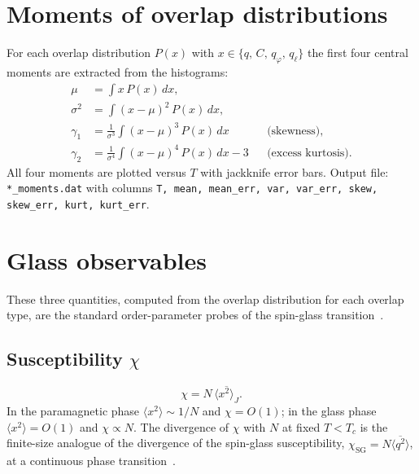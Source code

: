 \documentclass[11pt,a4paper]{article}
\newcommand{\avg}[1]{\langle #1 \rangle}
\newcommand{\avgJ}[1]{\overline{#1}}
\begin{document}
\section{Moments of overlap distributions}

For each overlap distribution $P(x)$ with $x \in \{q,\,C,\,q_\varphi,\,q_\ell\}$
the first four central moments are extracted from the histograms:
\begin{align}
  \mu   &= \int x\,P(x)\,dx, \\
  \sigma^2 &= \int (x - \mu)^2\,P(x)\,dx, \\
  \gamma_1 &= \frac{1}{\sigma^3}\int (x-\mu)^3\,P(x)\,dx
              &&\text{(skewness)}, \\
  \gamma_2 &= \frac{1}{\sigma^4}\int (x-\mu)^4\,P(x)\,dx - 3
              &&\text{(excess kurtosis)}.
\end{align}
All four moments are plotted versus $T$ with jackknife error bars.
Output file: \texttt{*\_moments.dat} with columns
\texttt{T, mean, mean\_err, var, var\_err, skew, skew\_err, kurt, kurt\_err}.

\section{Glass observables}

These three quantities, computed from the overlap distribution for
each overlap type, are the standard order-parameter probes of the
spin-glass transition~\cite{Binder1986,MPV1987}.

\subsection{Susceptibility $\chi$}
\begin{equation}
  \chi = N\,\avgJ{\avg{x^2}_J}.
\end{equation}
In the paramagnetic phase $\avg{x^2} \sim 1/N$ and $\chi = O(1)$;
in the glass phase $\avg{x^2} = O(1)$ and $\chi \propto N$.
The divergence of $\chi$ with $N$ at fixed $T < T_c$ is the
finite-size analogue of the divergence of the spin-glass
susceptibility, $\chi_{\mathrm{SG}} = N\avgJ{\avg{q^2}}$,
at a continuous phase transition~\cite{MPV1987,Binder1986}.
\end{document}
